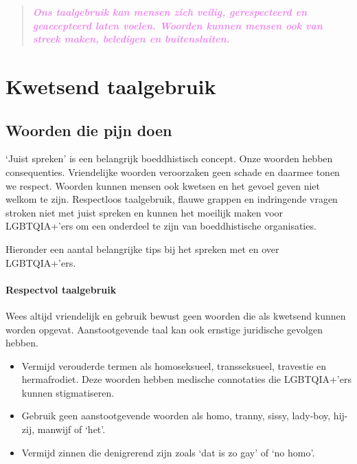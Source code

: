 \documentclass[12pt,openany]{book}
\begin{document}
\begin{quote}
\centering
\doublespacing
\textit{\Large \textcolor{violet}{\textbf{Ons taalgebruik kan mensen zich veilig, gerespecteerd en geaccepteerd laten voelen. Woorden kunnen mensen ook van streek maken, beledigen en buitensluiten.}}}
\end{quote}

\chapter*{Kwetsend taalgebruik}

\section*{Woorden die pijn doen}

`Juist spreken' is een belangrijk boeddhistisch concept. Onze woorden hebben consequenties. Vriendelijke woorden veroorzaken geen schade en daarmee tonen we respect. Woorden kunnen mensen ook kwetsen en het gevoel geven niet welkom te zijn. Respectloos taalgebruik, flauwe grappen en indringende vragen stroken niet met juist spreken en kunnen het moeilijk maken voor LGBTQIA+'ers om een onderdeel te zijn van boeddhistische organisaties.

Hieronder een aantal belangrijke tips bij het spreken met en over LGBTQIA+'ers.

\subsubsection*{Respectvol taalgebruik}

Wees altijd vriendelijk en gebruik bewust geen woorden die als kwetsend kunnen worden opgevat. Aanstootgevende taal kan ook ernstige juridische gevolgen hebben.

\begin{itemize}
  \setlength\itemsep{-0.3em}
  \item Vermijd verouderde termen als homoseksueel, transseksueel, travestie en hermafrodiet. Deze woorden hebben medische connotaties die LGBTQIA+'ers kunnen stigmatiseren.
  \item Gebruik geen aanstootgevende woorden als homo, tranny, sissy, lady-boy, hij-zij, manwijf of `het'.
  \item Vermijd zinnen die denigrerend zijn zoals `dat is zo gay' of `no homo'.
\end{itemize}
\end{document}
